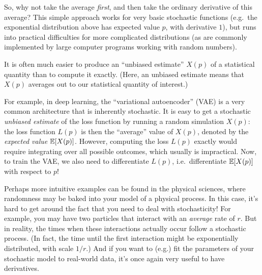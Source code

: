 So, why not take the average \emph{first}, and then take the ordinary derivative of this average?  This simple approach works for very basic stochastic functions (e.g.~the exponential distribution above has expected value $p$, with derivative $1$), but runs into practical difficulties for more complicated distributions (as are commonly implemented by large computer programs working with random numbers).
\begin{remark}
    It is often much easier to produce an ``unbiased estimate'' $X(p)$ of a statistical quantity than to compute it exactly. (Here, an unbiased estimate means that $X(p)$ averages out to our statistical quantity of interest.)
\end{remark}


For example, in deep learning, the ``variational autoencoder'' (VAE) is a very common architecture
that is inherently stochastic. It is easy to get a stochastic \emph{unbiased estimate} of the loss function by running a
random simulation $X(p)$: the loss function $L(p)$ is then the ``average'' value of $X(p)$, denoted by the \emph{expected value} $\mathbb E[X(p)]$.
However, computing the loss $L(p)$ exactly would require integrating over all possible outcomes, which usually is  impractical.
Now, to train the VAE, we also need to differentiate $L(p)$, i.e.~differentiate $\mathbb E[X(p)]$ with respect to $p$!

Perhaps more intuitive examples can be found in the physical sciences, where randomness may be baked into
your model of a physical process.
In this case, it's hard to get around the fact that you need to deal with stochasticity! 
For example, you may have two particles that interact with an \emph{average} rate of $r$.
But in reality, the times when these interactions actually occur follow a stochastic process. 
(In fact, the time until the first interaction might be exponentially distributed, with scale $1/r$.)
And if you want to (e.g.) fit the parameters of your stochastic model to real-world data, it's once again very useful to have derivatives.

